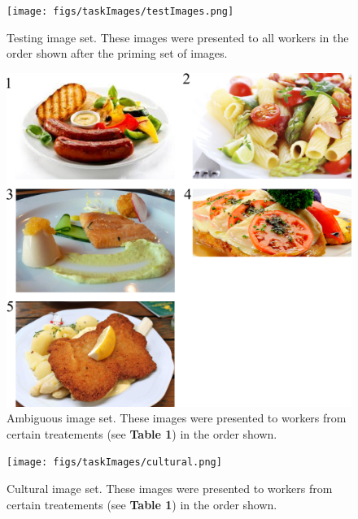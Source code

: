 \documentclass[a4paper]{report}
\begin{document}
\begin{figure}
	\texttt{[image: figs/taskImages/testImages.png]}
	\caption{Testing image set. These images were presented to all workers in 
		the order shown after the priming set of images.}
\end{figure}

\begin{figure}
	\includegraphics[scale=1.00]{figs/taskImages/ambiguous.png}
	\caption{ Ambiguous image set. These images were presented to workers from 
		certain treatements (see \textbf{Table 1}) in the order shown.}
\end{figure}

\begin{figure}
	\texttt{[image: figs/taskImages/cultural.png]}
	\caption{Cultural image set. These images were presented to workers from 
		certain treatements (see \textbf{Table 1}) in the order shown.}
\end{figure}
\end{document}
